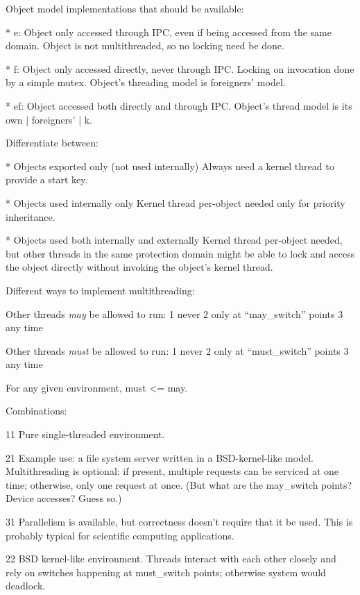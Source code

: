 {Object model implementations that should be available:

* e:
        Object only accessed through IPC,
        even if being accessed from the same domain.
        Object is not multithreaded, so no locking need be done.

* f: 
        Object only accessed directly, never through IPC\@.
        Locking on invocation done by a simple mutex.
        Object's threading model is foreigners' model.

* ef:
        Object accessed both directly and through IPC\@.
        Object's thread model is its own | foreigners' | k.


Differentiate between:

* Objects exported only (not used internally)
        Always need a kernel thread to provide a start key.

* Objects used internally only
        Kernel thread per-object needed only for priority inheritance.

* Objects used both internally and externally
        Kernel thread per-object needed,
        but other threads in the same protection domain
        might be able to lock and access the object directly
        without invoking the object's kernel thread.



Different ways to implement multithreading:


Other threads \emph{may} be allowed to run:
        1 never
        2 only at ``may_switch'' points
        3 any time

Other threads \emph{must} be allowed to run:
        1 never
        2 only at ``must_switch'' points
        3 any time

For any given environment, must <= may.

Combinations:

11      Pure single-threaded environment.

21      Example use: a file system server written in a BSD-kernel-like model.
        Multithreading is optional:
        if present, multiple requests can be serviced at one time;
        otherwise, only one request at once.
        (But what are the may_switch points?  Device accesses?  Guess so.)

31      Parallelism is available,
        but correctness doesn't require that it be used.
        This is probably typical for scientific computing applications.

22      BSD kernel-like environment.
        Threads interact with each other closely
        and rely on switches happening at must_switch points;
        otherwise system would deadlock.

}
